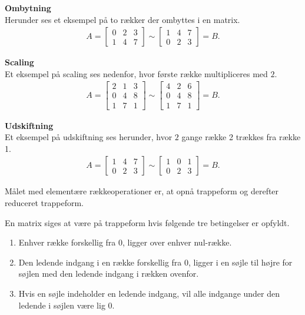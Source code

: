 \begin{eks}[Rækkeoperationer]
\textbf{Ombytning}\\
Herunder ses et eksempel på to rækker der ombyttes i en matrix.\\

\begin{align*}
A= \begin{bmatrix}
0 & 2 & 3 \\
1 & 4 & 7
\end{bmatrix}
\sim \begin{bmatrix}
1 & 4 & 7 \\
0 & 2 & 3
\end{bmatrix} = B.
\end{align*}

\textbf{Scaling} \\
Et eksempel på scaling ses nedenfor, hvor første række multipliceres med $2$.\\

\begin{align*}
A= \begin{bmatrix}
2 & 1 & 3 \\
0 & 4 & 8 \\
1 & 7 & 1
\end{bmatrix}
\sim \begin{bmatrix}
4 & 2 & 6 \\
0 & 4 & 8 \\
1 & 7 & 1
\end{bmatrix} = B.
\end{align*}

\textbf{Udskiftning}\\
Et eksempel på udskiftning ses herunder, hvor $2$ gange række 2 trækkes fra række 1.\\

\begin{align*}
A= \begin{bmatrix}
1 & 4 & 7 \\
0 & 2 & 3
\end{bmatrix}
\sim \begin{bmatrix}
1 & 0 & 1 \\
0 & 2 & 3
\end{bmatrix} = B.
\end{align*}
\end{eks}

Målet med elementære rækkeoperationer er, at opnå trappeform og derefter reduceret trappeform. 

\begin{defn}[Trappeform]
En matrix siges at være på trappeform hvis følgende tre betingelser er opfyldt. 
\begin{enumerate}
\item Enhver række forskellig fra 0, ligger over enhver nul-række.
\item Den ledende indgang i en række forskellig fra 0, ligger i en søjle til højre for søjlen med den ledende indgang i rækken ovenfor.
\item Hvis en søjle indeholder en ledende indgang, vil alle indgange under den ledende i søjlen være lig 0.
\end{enumerate}
\label{defn_trappe}
\end{defn}

